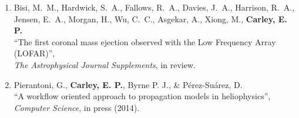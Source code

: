 \begin{enumerate}
\item Bisi, M.~M., Hardwick, S.~A., Fallows, R.~A., Davies, J.~A., Harrison, R.~A., Jensen, E.~A., Morgan, H.,
Wu, C.~C., Asgekar, A.,  Xiong, M.,  {\bf Carley, E. P.} \\
``The first coronal mass ejection observed with the Low Frequency Array (LOFAR)'', \\
\emph{The Astrophysical Journal Supplements}, in review.

\item Pierantoni, G., {\bf Carley, E. P.}, Byrne P. J., \& P\'{e}rez-Su\'{a}rez, D. \\
``A workflow oriented approach to propagation models in heliophysics'', \\
\emph{Computer Science}, in press (2014).

\end{enumerate}

